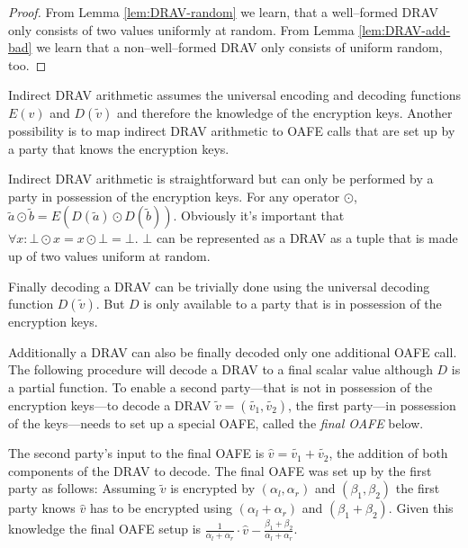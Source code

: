 \begin{proof}

  From Lemma \ref{lem:DRAV-random} we learn, that a well--formed DRAV only
  consists of two values uniformly at random. From Lemma \ref{lem:DRAV-add-bad}
  we learn that a non--well--formed DRAV only consists of uniform random, too.


\end{proof}


\label{sec:indirect-DRAV-arithmetic}

Indirect DRAV arithmetic assumes the universal encoding and decoding functions
$E(v)$ and $D(\widetilde{v})$ and therefore the knowledge of the encryption
keys. Another possibility is to map indirect DRAV arithmetic to OAFE calls that
are set up by a party that knows the encryption keys.

Indirect DRAV arithmetic is straightforward but can only be performed by a party
in possession of the encryption keys. For any operator $\odot$, $\widetilde{a}
\odot \widetilde{b} = E(D(\widetilde{a}) \odot D(\widetilde{b}))$. Obviously
it's important that $\forall x: \bot \odot x = x \odot \bot = \bot$. $\bot$ can
be represented as a DRAV as a tuple that is made up of two values uniform at
random.


\label{sec:drav-final-decoding}

Finally decoding a DRAV can be trivially done using the universal decoding
function $D(\widetilde{v})$. But $D$ is only available to a party that is in
possession of the encryption keys.

Additionally a DRAV can also be finally decoded only one additional OAFE call.
The following procedure will decode a DRAV to a final scalar value although
$D$ is a partial function. To enable a second party---that is not in possession
of the encryption keys---to decode a DRAV $\widetilde{v} = (\widetilde{v_1},
\widetilde{v_2})$, the first party---in possession of the keys---needs to set up
a special OAFE, called the \emph{final OAFE} below.

The second party's input to the final OAFE is $\widehat{v} = \widetilde{v_1} +
\widetilde{v_2}$, the addition of both components of the DRAV to decode.  The
final OAFE was set up by the first party as follows: Assuming $\widetilde{v}$ is
encrypted by $(\alpha_l, \alpha_r)$ and $(\beta_1, \beta_2)$ the first party
knows $\widehat{v}$ has to be encrypted using $(\alpha_l + \alpha_r)$ and
$(\beta_1 + \beta_2)$.  Given this knowledge the final OAFE setup is
$\frac{1}{\alpha_l + \alpha_r} \cdot \widehat{v} - \frac{\beta_1 +
\beta_2}{\alpha_l + \alpha_r}$.

